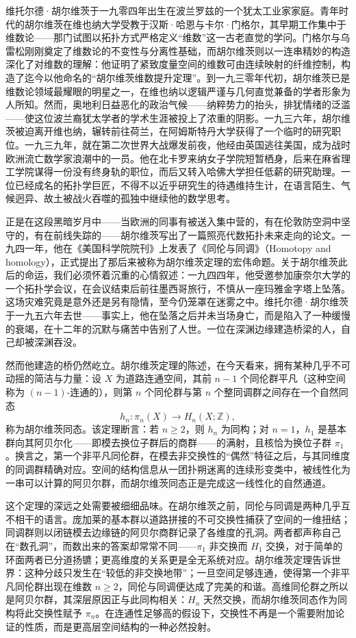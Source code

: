 \documentclass[12pt,a4paper]{article}
\begin{document}
维托尔德·胡尔维茨于一九零四年出生在波兰罗兹的一个犹太工业家家庭。青年时代的胡尔维茨在维也纳大学受教于汉斯·哈恩与卡尔·门格尔，其早期工作集中于维数论——那门试图以拓扑方式严格定义“维数”这一古老直觉的学问。门格尔与乌雷松刚刚奠定了维数论的不变性与分离性基础，而胡尔维茨则以一连串精妙的构造深化了对维数的理解：他证明了紧致度量空间的维数可由连续映射的纤维控制，构造了迄今以他命名的“胡尔维茨维数提升定理”。到一九三零年代初，胡尔维茨已是维数论领域最耀眼的明星之一，在维也纳以逻辑严谨与几何直觉兼备的学者形象为人所知。然而，奥地利日益恶化的政治气候——纳粹势力的抬头，排犹情绪的泛滥——使这位波兰裔犹太学者的学术生涯被投上了浓重的阴影。一九三六年，胡尔维茨被迫离开维也纳，辗转前往荷兰，在阿姆斯特丹大学获得了一个临时的研究职位。一九三九年，就在第二次世界大战爆发前夜，他经由英国逃往美国，成为战时欧洲流亡数学家浪潮中的一员。他在北卡罗来纳女子学院短暂栖身，后来在麻省理工学院谋得一份没有终身轨的职位，而后又转入哈佛大学担任低薪的研究助理。一位已经成名的拓扑学巨匠，不得不以近乎研究生的待遇维持生计，在语言陌生、气候迥异、故土被战火吞噬的孤独中继续他的数学思考。

正是在这段黑暗岁月中——当欧洲的同事有被送入集中营的，有在伦敦防空洞中坚守的，有在前线失踪的——胡尔维茨写出了一篇照亮代数拓扑未来走向的论文。一九四一年，他在《美国科学院院刊》上发表了《同伦与同调》（Homotopy and homology），正式提出了那后来被称为胡尔维茨定理的宏伟命题。关于胡尔维茨此后的命运，我们必须怀着沉重的心情叙述：一九四四年，他受邀参加康奈尔大学的一个拓扑学会议，在会议结束后前往墨西哥旅行，不慎从一座玛雅金字塔上坠落。这场灾难究竟是意外还是另有隐情，至今仍笼罩在迷雾之中。维托尔德·胡尔维茨于一九五六年去世——事实上，他在坠落之后并未当场身亡，而是陷入了一种缓慢的衰竭，在十二年的沉默与痛苦中告别了人世。一位在深渊边缘建造桥梁的人，自己却被深渊吞没。

然而他建造的桥仍然屹立。胡尔维茨定理的陈述，在今天看来，拥有某种几乎不可动摇的简洁与力量：设 $X$ 为道路连通空间，其前 $n-1$ 个同伦群平凡（这种空间称为 $(n-1)$-连通的），则第 $n$ 个同伦群与第 $n$ 个整同调群之间存在一个自然同态
$$
h_n: \pi_n(X) \to H_n(X;\mathbb{Z}),
$$
称为胡尔维茨同态。该定理断言：若 $n \geq 2$，则 $h_n$ 为同构；对 $n=1$，$h_1$ 是基本群向其阿贝尔化——即模去换位子群后的商群——的满射，且核恰为换位子群 $\pi_1$。换言之，第一个非平凡同伦群，在模去非交换性的“偶然”特征之后，与其同维度的同调群精确对应。空间的结构信息从一团扑朔迷离的连续形变类中，被线性化为一串可以计算的阿贝尔群，而胡尔维茨同态正是完成这一线性化的自然通道。

这个定理的深远之处需要被细细品味。在胡尔维茨之前，同伦与同调是两种几乎互不相干的语言。庞加莱的基本群以道路拼接的不可交换性捕获了空间的一维扭结；同调群则以闭链模去边缘链的阿贝尔商群记录了各维度的孔洞。两者都声称自己在“数孔洞”，而数出来的答案却常常不同——$\pi_1$ 非交换而 $H_1$ 交换，对于简单的环面两者已分道扬镳；更高维度的关系更是全无系统对应。胡尔维茨定理告诉世界：这种分歧只发生在“较低的非交换地带”；一旦空间足够连通，使得第一个非平凡同伦群出现在维数 $n \geq 2$，同伦与同调便达成了完美的和谐。高维同伦群之所以是阿贝尔群，其深层原因正与此同构相关：$H_n$ 天然交换，而胡尔维茨同态作为同构将此交换性赋予 $\pi_n$。在连通性足够高的假设下，交换性不再是一个需要附加论证的性质，而是更高层空间结构的一种必然投射。
\end{document}
